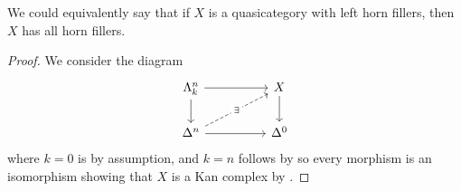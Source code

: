 \begin{remark}
    We could equivalently say that if $X$ is a quasicategory with left horn fillers, then $X$ has all horn fillers. 
\end{remark}
\begin{proof}
    We consider the diagram 
    $$%
    \begin{tikzcd}
        {\Lambda^{n}_{k}} && X \\
        {\Delta^{n}} && {\Delta^{0}}
        \arrow[from=2-1, to=2-3]
        \arrow[from=1-1, to=1-3]
        \arrow[from=1-3, to=2-3]
        \arrow[from=1-1, to=2-1]
        \arrow["\exists"{description}, dashed, from=2-1, to=1-3]
    \end{tikzcd}$$
    where $k=0$ is by assumption, and $k=n$ follows by  so every morphism is an isomorphism showing that $X$ is a Kan complex by . 
\end{proof}
